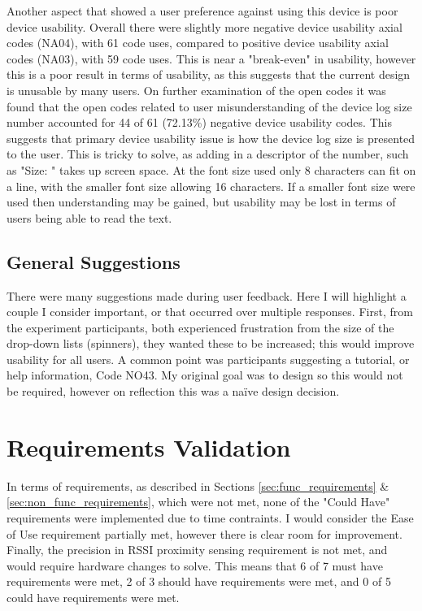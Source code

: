 \documentclass{l4proj}
\begin{document}
Another aspect that showed a user preference against using this device is poor device usability. Overall there were slightly more negative device usability axial codes (NA04), with 61 code uses, compared to positive device usability axial codes (NA03), with 59 code uses. This is near a "break-even" in usability, however this is a poor result in terms of usability, as this suggests that the current design is unusable by many users. On further examination of the open codes it was found that the open codes related to user misunderstanding of the device log size number accounted for 44 of 61 (72.13\%) negative device usability codes. This suggests that primary device usability issue is how the device log size is presented to the user. This is tricky to solve, as adding in a descriptor of the number, such as "Size: " takes up screen space. At the font size used only 8 characters can fit on a line, with the smaller font size allowing 16 characters. If a smaller font size were used then understanding may be gained, but usability may be lost in terms of users being able to read the text.

\subsection{General Suggestions}

There were many suggestions made during user feedback. Here I will highlight a couple I consider important, or that occurred over multiple responses. First, from the experiment participants, both experienced frustration from the size of the drop-down lists (spinners), they wanted these to be increased; this would improve usability for all users. A common point was participants suggesting a tutorial, or help information, Code NO43. My original goal was to design so this would not be required, however on reflection this was a naïve design decision.

\section{Requirements Validation}

In terms of requirements, as described in Sections \ref{sec:func_requirements} \& \ref{sec:non_func_requirements}, which were not met, none of the "Could Have" requirements were implemented due to time contraints. I would consider the Ease of Use requirement partially met, however there is clear room for improvement. Finally, the precision in RSSI proximity sensing requirement is not met, and would require hardware changes to solve. This means that 6 of 7 must have requirements were met, 2 of 3 should have requirements were met, and 0 of 5 could have requirements were met.
\end{document}
